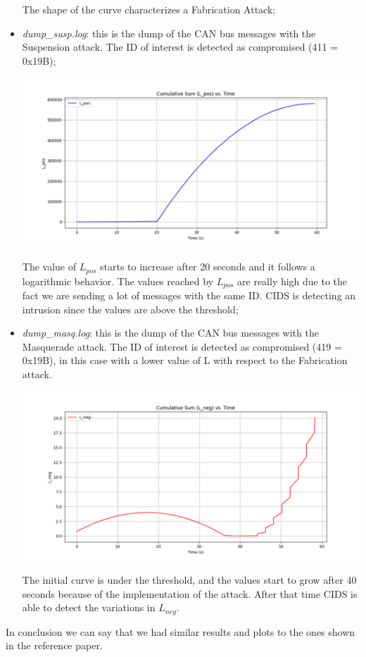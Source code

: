 \documentclass[12pt]{article}
\begin{document}
\begin{itemize}
    The shape of the curve characterizes a Fabrication Attack;
    \item \textit{dump\_susp.log}: this is the dump of the CAN bus messages with the Suspension 
    attack. The ID of interest is detected as compromised (411 = 0x19B);
    \begin{center}
        \vspace{-0.5cm}
        \hspace*{-2cm}
        \includegraphics[scale=0.5]{img/LposSusp.png}
    \end{center}
    The value of $L_{pos}$ starts to increase after 20 seconds and it follows a logarithmic behavior. The values
    reached by $L_{pos}$ are really high due to the fact we are sending a lot of messages with the same ID.
    CIDS is detecting an intrusion since the values are above the threshold;
    \item \textit{dump\_masq.log}: this is the dump of the CAN bus messages with the Masquerade attack. 
    The ID of interest is detected as compromised (419 = 0x19B), in this case with a lower value 
    of L with respect to the Fabrication attack. 
    \begin{center}
        \vspace{-1cm}
        \hspace*{-2cm}
        \includegraphics[scale=0.5]{img/LnegMasq.png}
    \end{center}
    The initial curve is under the threshold, and the values start to grow after 40 seconds because of the implementation of the attack.
    After that time CIDS is able to detect the variations in $L_{neg}$.
\end{itemize}
In conclusion we can say that we had similar results and plots to the ones shown in the reference paper. 

\printbibliography 
\end{document}
